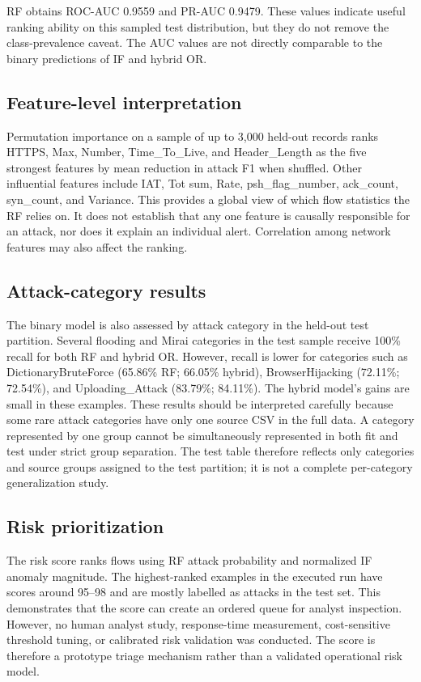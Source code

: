 \documentclass[runningheads]{llncs}
\begin{document}
RF obtains ROC-AUC 0.9559 and PR-AUC 0.9479. These values indicate useful ranking ability on this sampled test distribution, but they do not remove the class-prevalence caveat. The AUC values are not directly comparable to the binary predictions of IF and hybrid OR.

\subsection{Feature-level interpretation}
Permutation importance on a sample of up to 3,000 held-out records ranks HTTPS, Max, Number, Time\_To\_Live, and Header\_Length as the five strongest features by mean reduction in attack F1 when shuffled. Other influential features include IAT, Tot sum, Rate, psh\_flag\_number, ack\_count, syn\_count, and Variance. This provides a global view of which flow statistics the RF relies on. It does not establish that any one feature is causally responsible for an attack, nor does it explain an individual alert. Correlation among network features may also affect the ranking.

\subsection{Attack-category results}
The binary model is also assessed by attack category in the held-out test partition. Several flooding and Mirai categories in the test sample receive 100\% recall for both RF and hybrid OR. However, recall is lower for categories such as DictionaryBruteForce (65.86\% RF; 66.05\% hybrid), BrowserHijacking (72.11\%; 72.54\%), and Uploading\_Attack (83.79\%; 84.11\%). The hybrid model's gains are small in these examples. These results should be interpreted carefully because some rare attack categories have only one source CSV in the full data. A category represented by one group cannot be simultaneously represented in both fit and test under strict group separation. The test table therefore reflects only categories and source groups assigned to the test partition; it is not a complete per-category generalization study.

\subsection{Risk prioritization}
The risk score ranks flows using RF attack probability and normalized IF anomaly magnitude. The highest-ranked examples in the executed run have scores around 95--98 and are mostly labelled as attacks in the test set. This demonstrates that the score can create an ordered queue for analyst inspection. However, no human analyst study, response-time measurement, cost-sensitive threshold tuning, or calibrated risk validation was conducted. The score is therefore a prototype triage mechanism rather than a validated operational risk model.
\end{document}
